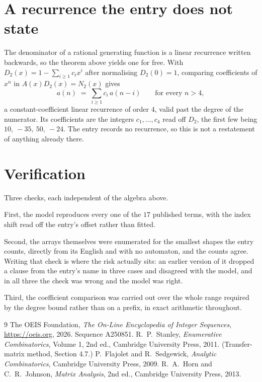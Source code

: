 \documentclass[11pt,a4paper]{article}
\theoremstyle{plain}
\theoremstyle{definition}
\begin{document}
\section{A recurrence the entry does not state}

The denominator of a rational generating function is a linear recurrence written backwards, so
the theorem above yields one for free. With $D_2(x)=1-\sum_{i\ge1}c_ix^i$ after normalising
$D_2(0)=1$, comparing coefficients of $x^n$ in $A(x)D_2(x)=N_2(x)$ gives
\[
a(n)\;=\;\sum_{i\ge1}c_i\,a(n-i)\qquad\text{for every }n>4,
\]
a constant-coefficient linear recurrence of order $4$, valid past the degree of the
numerator. Its coefficients are the integers $c_1,\dots,c_{4}$ read off $D_2$, the first few being $10,\ -35,\ 50,\ -24$. The entry records no recurrence, so this is not a restatement of anything
already there.

\section{Verification}

Three checks, each independent of the algebra above.

First, the model reproduces every one of the $17$ published terms, with the index shift
read off the entry's offset rather than fitted.

Second, the arrays themselves were enumerated for the smallest shapes the entry counts,
directly from its English and with no automaton, and the counts agree. Writing that check is
where the risk actually sits: an earlier version of it dropped a clause from the entry's name
in three cases and disagreed with the model, and in all three the check was wrong and the model
was right.

Third, the coefficient comparison was carried out over the whole range required by the degree
bound rather than on a prefix, in exact arithmetic throughout.

\begin{thebibliography}{9}
 The OEIS Foundation, \emph{The On-Line Encyclopedia of Integer
Sequences}, \url{https://oeis.org}, 2026. Sequence A250851.
 R.~P.~Stanley, \emph{Enumerative Combinatorics}, Volume 1, 2nd ed.,
Cambridge University Press, 2011. (Transfer-matrix method, Section 4.7.)
 P.~Flajolet and R.~Sedgewick, \emph{Analytic Combinatorics}, Cambridge
University Press, 2009.
 R.~A.~Horn and C.~R.~Johnson, \emph{Matrix Analysis}, 2nd ed., Cambridge
University Press, 2013.
\end{thebibliography}
\end{document}
